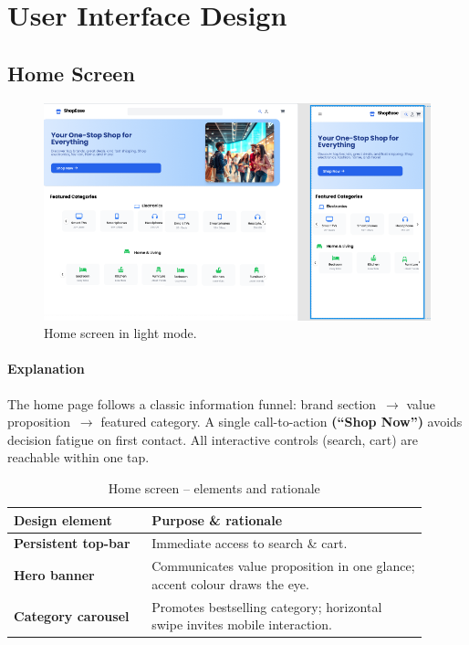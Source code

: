 \documentclass[12pt]{article}
\begin{document}
	\section{User Interface Design}\label{sec:user-interface-design}


	\subsection{Home Screen}\label{subsec:home-screen}

		\begin{figure}[H]
		\centering
		\includegraphics[width=\linewidth]{pictures/main/Home_figma}%
		\caption{Home screen in light mode.}
		\label{fig:ui-home}
	\end{figure}

	\paragraph{Explanation}%
	The home page follows a classic information funnel: brand section~$\rightarrow$ value
	proposition~$\rightarrow$ featured category.
	A single call-to-action
	\textbf{(“Shop Now”)} avoids decision fatigue on first contact.
	All interactive controls (search, cart) are reachable within one
	tap.

	\begin{table}[H]
		\centering
		\caption{Home screen – elements and rationale}
		\label{tab:home-elements}
		\begin{tabular}{p{0.30\linewidth} p{0.60\linewidth}}
			\hline
			\textbf{Design element} 		 & Purpose \& rationale \\ 	\hline
			\textbf{Persistent top-bar}      & Immediate access to search \& cart.\\
			\textbf{Hero banner}             & Communicates value proposition in one glance; accent colour draws the eye.\\
			\textbf{Category carousel}       & Promotes bestselling category; horizontal swipe invites mobile interaction.\\
			\hline
		\end{tabular}
	\end{table}
\end{document}
